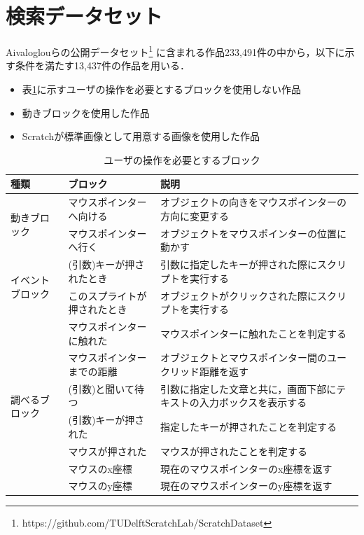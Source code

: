 \documentclass[11pt]{jreport}
\begin{document}
\section{検索データセット}
Aivaloglouらの公開データセット\cite{dataset}\footnote{https://github.com/TUDelftScratchLab/ScratchDataset}
に含まれる作品233,491件の中から，以下に示す条件を満たす13,437件の作品を用いる．
\begin{itemize}
    \item 表\ref{interactionblock}に示すユーザの操作を必要とするブロックを使用しない作品
    \item 動きブロックを使用した作品
    \item Scratchが標準画像として用意する画像を使用した作品
\end{itemize}

\begin{table}
    \caption{ユーザの操作を必要とするブロック}
    \label{interactionblock}
    \centering
    \begin{tabularx}{\textwidth}{l|l|X}
    \hline
        種類 & ブロック & 説明 \\
        \hline \hline
        \multirow{2}{*}{動きブロック} 
        & マウスポインターへ向ける & オブジェクトの向きをマウスポインターの方向に変更する \\
        \cline{2-3}
        & マウスポインターへ行く & オブジェクトをマウスポインターの位置に動かす \\
        \hline
        \multirow{2}{*}{イベントブロック}
        & (引数)キーが押されたとき & 引数に指定したキーが押された際にスクリプトを実行する \\
        \cline{2-3}
        & このスプライトが押されたとき & オブジェクトがクリックされた際にスクリプトを実行する \\
        \hline
        \multirow{7}{*}{調べるブロック} & マウスポインターに触れた & マウスポインターに触れたことを判定する \\
        \cline{2-3}
        & マウスポインターまでの距離 & オブジェクトとマウスポインター間のユークリッド距離を返す \\
        \cline{2-3}
        & (引数)と聞いて待つ & 引数に指定した文章と共に，画面下部にテキストの入力ボックスを表示する \\
        \cline{2-3}
        & (引数)キーが押された & 指定したキーが押されたことを判定する \\
        \cline{2-3}
        & マウスが押された & マウスが押されたことを判定する \\
        \cline{2-3}
        & マウスのx座標 & 現在のマウスポインターのx座標を返す \\
        \cline{2-3}
        & マウスのy座標 & 現在のマウスポインターのy座標を返す \\
        \hline
    \end{tabularx}
\end{table}
\end{document}
